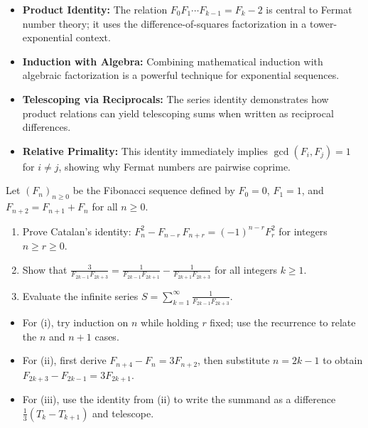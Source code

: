 \begin{takeaways}
\begin{itemize}[leftmargin=*]
    \item \textbf{Product Identity:} The relation $F_0 F_1 \cdots F_{k-1} = F_k - 2$ is central to Fermat number theory; it uses the difference-of-squares factorization in a tower-exponential context.
    \item \textbf{Induction with Algebra:} Combining mathematical induction with algebraic factorization is a powerful technique for exponential sequences.
    \item \textbf{Telescoping via Reciprocals:} The series identity demonstrates how product relations can yield telescoping sums when written as reciprocal differences.
    \item \textbf{Relative Primality:} This identity immediately implies $\gcd(F_i, F_j) = 1$ for $i \neq j$, showing why Fermat numbers are pairwise coprime.
\end{itemize}
\end{takeaways}

\begin{problem}\label{sec:fib-telescoping-03}
Let $(F_n)_{n\ge 0}$ be the Fibonacci sequence defined by $F_0=0$, $F_1=1$, and $F_{n+2}=F_{n+1}+F_n$ for all $n\ge 0$.

\begin{enumerate}[leftmargin=*]
	\item Prove Catalan's identity: $\displaystyle F_{n}^2 - F_{n-r}\,F_{n+r} = (-1)^{n-r} F_r^2$ for integers $n\ge r\ge 0$.
	\item Show that $\displaystyle \frac{3}{F_{2k-1} F_{2k+3}} = \frac{1}{F_{2k-1} F_{2k+1}} - \frac{1}{F_{2k+1} F_{2k+3}}$ for all integers $k\ge 1$.
	\item Evaluate the infinite series $\displaystyle S = \sum_{k=1}^{\infty} \frac{1}{F_{2k-1} F_{2k+3}}$.
\end{enumerate}
\end{problem}

\begin{hint}
\begin{itemize}[leftmargin=*]
	\item For (i), try induction on $n$ while holding $r$ fixed; use the recurrence to relate the $n$ and $n\!+\!1$ cases.
	\item For (ii), first derive $F_{n+4}-F_n=3F_{n+2}$, then substitute $n=2k-1$ to obtain $F_{2k+3}-F_{2k-1}=3F_{2k+1}$.
	\item For (iii), use the identity from (ii) to write the summand as a difference $\tfrac{1}{3}(T_k-T_{k+1})$ and telescope.
\end{itemize}
\end{hint}

